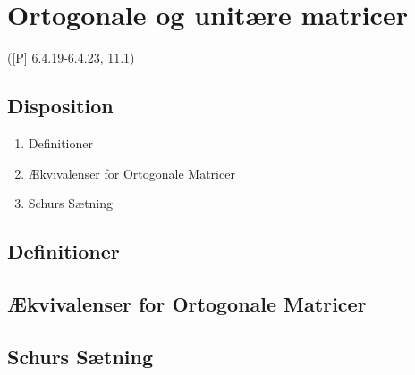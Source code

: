 \newpage
\chapter{Ortogonale og unitære matricer}
([P] 6.4.19-6.4.23, 11.1)

\section*{Disposition}
\begin{enumerate}
	\item Definitioner
	\item Ækvivalenser for Ortogonale Matricer
	\item Schurs Sætning
\end{enumerate}

\section{Definitioner}


\section{Ækvivalenser for Ortogonale Matricer}


\section{Schurs Sætning}



